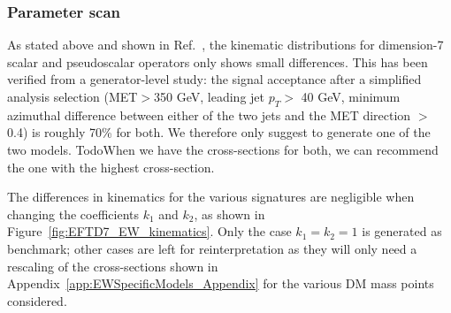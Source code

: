 \subsubsection{Parameter scan}

As stated above and shown in Ref.~\cite{Nelson:2013pqa}, 
the kinematic distributions for dimension-7 scalar and pseudoscalar operators
only shows small differences. This has been verified from a generator-level study:
the signal acceptance after a simplified analysis selection 
(MET$>$350 GeV, leading jet $p_T > $ 40 GeV, minimum azimuthal difference between
either of the two jets and the MET direction $>$ 0.4) is roughly 70\% for both. 
We therefore only suggest to generate one of the two models. 
Todo{When we have the cross-sections for both, we can recommend the one with the highest cross-section.}


The differences in kinematics for the various signatures
are negligible when changing the coefficients $k_1$ and $k_2$, as shown
in Figure~\ref{fig:EFTD7_EW_kinematics}. Only the case $k_1=k_2=1$ is generated as benchmark;
other cases are left for reinterpretation as they will only need a rescaling of the cross-sections
shown in Appendix~\ref{app:EWSpecificModels_Appendix} for the various DM
mass points considered.

